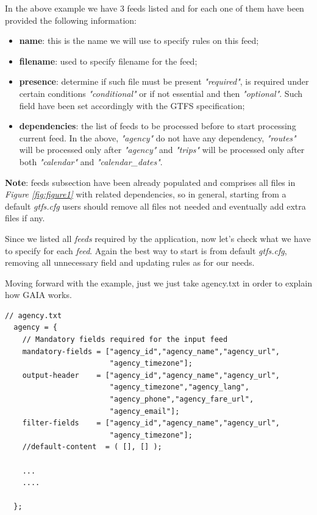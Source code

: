 \documentclass[12pt, a4paper]{book}
\begin{document}
\begin{justify}
In the above example we have 3 feeds listed and for each one of them have been provided the following information:
\begin{itemize}
\item \textbf{name}: this is the name we will use to specify rules on this feed;
\item \textbf{filename}: used to specify filename for the feed;
\item \textbf{presence}: determine if such file must be present \textit{"required"}, is required under certain conditions \textit{"conditional"} or if not essential and then \textit{"optional"}. Such field have been set accordingly with the GTFS specification;
\item \textbf{dependencies}: the list of feeds to be processed before to start processing current feed. In the above, \textit{"agency"} do not have any dependency, \textit{"routes"} will be processed only after \textit{"agency"} and  \textit{"trips"} will be processed only after both \textit{"calendar"} and \textit{"calendar\_dates"}.
\end{itemize}
\textbf{Note}: feeds subsection have been already populated and comprises all files in \textit{Figure \ref{fig:figure1}} with related dependencies, so in general, starting from a default \textit{gtfs.cfg} users should remove all files not needed and eventually add extra files if any.
\end{justify}

\begin{justify}
Since we listed all \textit{feeds} required by the application, now let's check what we have to specify for each \textit{feed}. Again the best way to start is from default \textit{gtfs.cfg}, removing all unnecessary field and updating rules as for our needs.
\end{justify}

\begin{justify}
Moving forward with the example, just we just take agency.txt in order to explain how GAIA works.
\end{justify}

\begin{small}
\begin{lstlisting}[backgroundcolor=\color{gray},frame=single]
 // agency.txt
  agency = {
    // Mandatory fields required for the input feed
    mandatory-fields = ["agency_id","agency_name","agency_url",
                        "agency_timezone"];
    output-header    = ["agency_id","agency_name","agency_url",
                        "agency_timezone","agency_lang",
                        "agency_phone","agency_fare_url",
                        "agency_email"];
    filter-fields    = ["agency_id","agency_name","agency_url",
                        "agency_timezone"];
    //default-content  = ( [], [] );
    
    ...
    ....

  };
\end{lstlisting}
\end{small}
\end{document}
